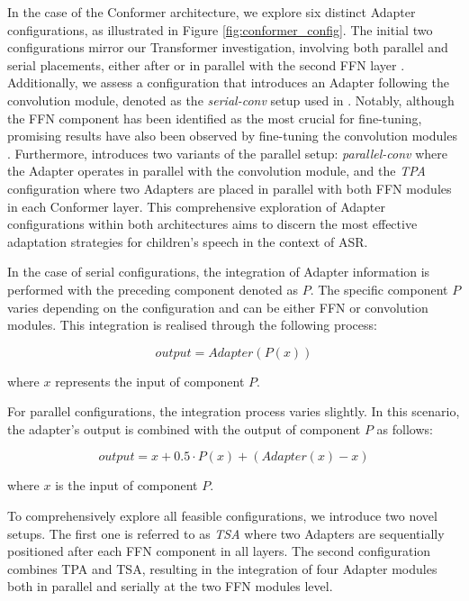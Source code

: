 In the case of the Conformer architecture, we explore six distinct Adapter configurations, as illustrated in Figure \ref{fig:conformer_config}. The initial two configurations mirror our Transformer investigation, involving both parallel and serial placements, either after or in parallel with the second \ac{FFN} layer \cite{chen2023efficient}. Additionally, we assess a configuration that introduces an Adapter following the convolution module, denoted as the \textit{serial-conv} setup used in \cite{10095837}. Notably, although the \ac{FFN} component has been identified as the most crucial for fine-tuning, promising results have also been observed by fine-tuning the convolution modules \cite{chen2023efficient}. Furthermore, \cite{chen2023efficient} introduces two variants of the parallel setup: \textit{parallel-conv} where the Adapter operates in parallel with the convolution module, and the \textit{\ac{TPA}} configuration where two Adapters are placed in parallel with both \ac{FFN} modules in each Conformer layer. This comprehensive exploration of Adapter configurations within both architectures aims to discern the most effective adaptation strategies for children's speech in the context of \ac{ASR}. 


In the case of serial configurations, the integration of Adapter information is performed with the preceding component denoted as $P$. The specific component $P$ varies depending on the configuration and can be either \ac{FFN} or convolution modules. This integration is realised through the following process:

\begin{equation}
    output =  Adapter(P(x))
\end{equation}

where $x$ represents the input of component $P$.

For parallel configurations, the integration process varies slightly. In this scenario, the adapter's output is combined with the output of component $P$ as follows:

\begin{equation}
    output = x + 0.5 \cdot P(x) + (Adapter(x) - x)
\end{equation}

where $x$ is the input of component $P$.

To comprehensively explore all feasible configurations, we introduce two novel setups. The first one is referred to as \textit{\ac{TSA}} where two Adapters are sequentially positioned after each \ac{FFN} component in all layers. The second configuration combines \ac{TPA} and \ac{TSA}, resulting in the integration of four Adapter modules both in parallel and serially at the two \ac{FFN} modules level. 



